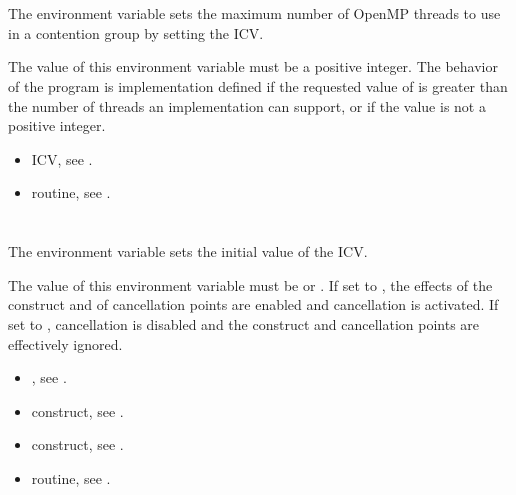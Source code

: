 \section{}
\label{sec:OMP_THREAD_LIMIT}
The  environment variable sets the maximum number of OpenMP threads to use in a contention group by setting the  ICV. 

The value of this environment variable must be a positive integer. The behavior of the 
program is implementation defined if the requested value of  is 
greater than the number of threads an implementation can support, or if the value is not 
a positive integer. 

\crossreferences
\begin{itemize}
\item {} ICV, see .

\item {} routine, see .
\end{itemize}









\section{}
\label{sec:OMP_CANCELLATION}
The  environment variable sets the initial value of the  
ICV.

The value of this environment variable must be  or . If set to , the 
effects of the  construct and of cancellation points are enabled and cancellation 
is activated. If set to , cancellation is disabled and the  construct and 
cancellation points are effectively ignored.

\crossreferences
\begin{itemize}
\item {}, see .

\item {} construct, see . 

\item {} construct, see .

\item {} routine, see .
\end{itemize}









